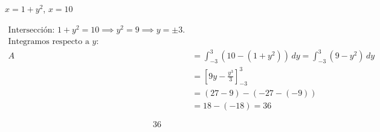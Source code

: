 $x=1+y^2$, $x=10$

\nopagebreak
\begin{align*}
\text{Intersección: } 1+y^2 = 10 \implies y^2=9 \implies y=\pm 3. \\
\text{Integramos respecto a } y: \\
A &= \int_{-3}^{3} (10 - (1+y^2)) \, dy = \int_{-3}^{3} (9-y^2) \, dy \\
&= \left[ 9y - \frac{y^3}{3} \right]_{-3}^{3} \\
&= (27 - 9) - (-27 - (-9)) \\
&= 18 - (-18) = 36
\end{align*}

\[
\boxed{\displaystyle 36}
\]
